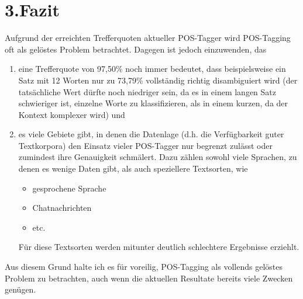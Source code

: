 \documentclass{article}
\begin{document}
\section{3.\hspace*{0.5em}Fazit}\label{sec-fazit}%

\noindent{}Aufgrund der erreichten Trefferquoten aktueller POS-Tagger wird POS-Tagging oft als gelöstes Problem betrachtet. Dagegen ist jedoch einzuwenden, das%

\begin{enumerate}[noitemsep,topsep=\mdcompacttopsep]%

\item{}eine Trefferquote von 97,50\% noch immer bedeutet, dass beispielsweise ein Satz mit 12 Worten nur zu 73,79\% vollständig richtig disambiguiert wird (der tatsächliche Wert dürfte noch niedriger sein, da es in einem langen Satz schwieriger ist, einzelne Worte zu klassifizieren, als in einem kurzen, da der Kontext komplexer wird) und%

\item{}es viele Gebiete gibt, in denen die Datenlage (d.h. die Verfügbarkeit guter Textkorpora) den Einsatz vieler POS-Tagger nur begrenzt zulässt oder zumindest ihre Genauigkeit schmälert. Dazu zählen sowohl viele Sprachen, zu denen es wenige Daten gibt, als auch speziellere Textsorten, wie 

\begin{itemize}[noitemsep,topsep=\mdcompacttopsep]%

\item{}gesprochene Sprache%

\item{}Chatnachrichten%

\item{}etc.%
\end{itemize}%
Für diese Textsorten werden mitunter deutlich schlechtere Ergebnisse erziehlt.%
\end{enumerate}%

\noindent{}Aus diesem Grund halte ich es für voreilig, POS-Tagging als vollends gelöstes Problem zu betrachten, auch wenn die aktuellen Resultate bereits viele Zwecken genügen.%
\end{document}
